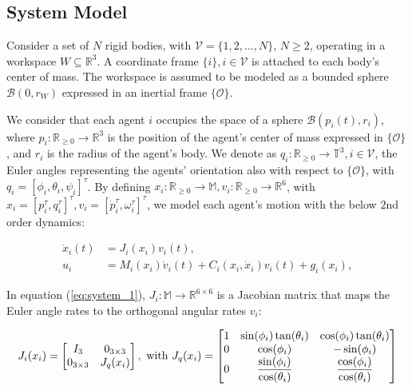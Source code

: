 \subsection{System Model}

Consider a set of $N$ rigid bodies, with $\mathcal{V} = \{ 1,2, \ldots, N\}$,
$N  \geq 2$, operating in a workspace $W\subseteq \mathbb{R}^3$.
A coordinate frame $\{i\}, i\in\mathcal{V}$ is attached to each body's
center of mass. The workspace is assumed to be modeled as a
bounded sphere $\mathcal{B}(0,r_W)$ expressed in an inertial frame
$\{\mathcal{O}\}$.

We consider that each agent $i$ occupies the space of a sphere
$\mathcal{B}(p_i(t), r_i)$, where $p_i : \mathbb{R}_{\geq 0} \to \mathbb{R}^3$
is the position of the agent's center of mass expressed in $\{\mathcal{O}\}$,
and $r_i$ is the radius of the agent's body.
We denote as $q_i:\mathbb{R}_{\geq 0} \to \mathbb{T}^3, i\in\mathcal{V}$,
the Euler angles representing the agents' orientation also with respect to
$\{\mathcal{O}\}$, with $q_i = [\phi_i,\theta_i,\psi_i]^\tau$.
By defining $x_i:\mathbb{R}_{\geq 0} \to \mathbb{M}, v_i : \mathbb{R}_{\geq 0} \to \mathbb{R}^6$,
with $x_i = [p^\tau_i,q^\tau_i]^\tau, v_i =[\dot{p}^\tau_i,\omega^\tau_i]^\tau$,
we model each agent's motion with the below $2$nd order dynamics:

\begin{subequations}
	\begin{align}
    \dot{x}_i(t) &= J_i(x_i)v_i(t), \label{eq:system_1} \\
    u_i &= M_i(x_i) \dot{v}_i(t) + C_i(x_i,\dot{x}_i) v_i(t)+g_i(x_i), \label{eq:system_2}
	\end{align}
  \label{eq:system}
\end{subequations}

In equation (\ref{eq:system_1}), $J_i:\mathbb{M} \to \mathbb{R}^{6\times6}$ is
a Jacobian matrix that maps the Euler angle rates to the orthogonal angular
rates $v_i$:

\begin{equation}
  J_i(x_i) =
  \begin{bmatrix}
  I_3 & 0_{3 \times 3} \\
  0_{3 \times 3} & J_{ q }(x_i) \\
  \end{bmatrix} \notag, \text{ with }
  J_q(x_i) =
  \begin{bmatrix}
  1 & \sin(\phi_i) \tan(\theta_i)  & \cos(\phi_i) \tan(\theta_i) \\
  0 & \cos(\phi_i) & -\sin(\phi_i) \\
  0  & \displaystyle \frac{\sin(\phi_i)}{\cos(\theta_i)} & \displaystyle \frac{\cos(\phi_i)}{\cos(\theta_i)}
  \end{bmatrix} \notag
\end{equation}

